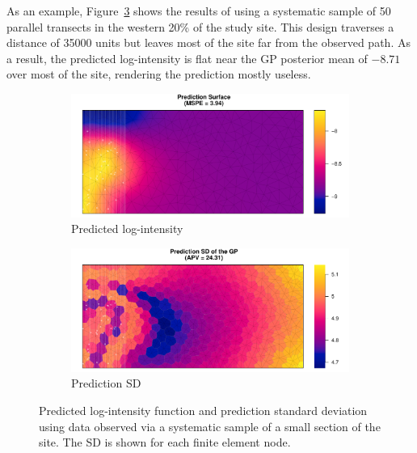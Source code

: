\documentclass[review]{elsarticle}
\begin{document}
As an example, Figure~\ref{badxsect} shows the results of using a systematic
sample of 50 parallel transects in the western 20\% of the study site. This
design traverses a distance of 35000 units but leaves most of the site far from
the observed path. As a result, the predicted log-intensity is flat near the
GP posterior mean of \(-8.71\) over most of the site, rendering the prediction
mostly useless.

\begin{figure}

\begin{subfigure}{5in}
\includegraphics[width=5in]{../graphics/lambda-BadXsect-LGCP000004.pdf}
\caption{Predicted log-intensity}
\label{lambdabad}
\end{subfigure}

\begin{subfigure}{5in}
\includegraphics[width=5in]{../graphics/lambdaSD-BadXsect-LGCP000004.pdf}
\caption{Prediction SD}
\label{sdbad}
\end{subfigure}

\caption{Predicted log-intensity function and prediction standard deviation
using data observed via a systematic sample of a small section of the site. The
SD is shown for each finite element node.}
\label{badxsect}
\end{figure}
\end{document}
